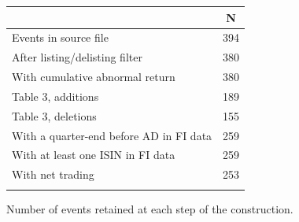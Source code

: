 \begin{threeparttable}
\begingroup
\renewcommand\cellalign{t}
\renewcommand\arraystretch{1}
\setlength{\tabcolsep}{5pt}
\begin{tabular}{@{}lc}
\toprule
 & N \\
\midrule
\addlinespace[1ex]
Events in source file & 394 \\
\addlinespace[0.25ex]
\addlinespace[0.25ex]
After listing/delisting filter & 380 \\
\addlinespace[0.25ex]
\addlinespace[0.25ex]
With cumulative abnormal return & 380 \\
\addlinespace[0.25ex]
\addlinespace[0.25ex]
Table 3, additions & 189 \\
\addlinespace[0.25ex]
\addlinespace[0.25ex]
Table 3, deletions & 155 \\
\addlinespace[0.25ex]
\addlinespace[0.25ex]
With a quarter-end before AD in FI data & 259 \\
\addlinespace[0.25ex]
\addlinespace[0.25ex]
With at least one ISIN in FI data & 259 \\
\addlinespace[0.25ex]
\addlinespace[0.25ex]
With net trading & 253 \\
\addlinespace[0.25ex]
\bottomrule
\end{tabular}
\endgroup
\noindent\begin{minipage}{\linewidth}\smallskip\footnotesize
Number of events retained at each step of the construction.\end{minipage}

\end{threeparttable}